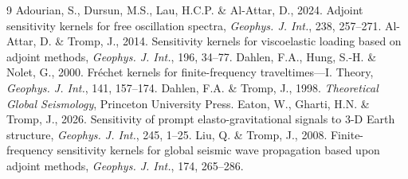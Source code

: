 \documentclass[11pt,a4paper]{article}
\theoremstyle{remark}
\begin{document}
\begin{thebibliography}{9}
Adourian, S., Dursun, M.S., Lau, H.C.P. \& Al-Attar, D., 2024. Adjoint
sensitivity kernels for free oscillation spectra, \emph{Geophys. J. Int.},
238, 257--271.
Al-Attar, D. \& Tromp, J., 2014. Sensitivity kernels for viscoelastic
loading based on adjoint methods, \emph{Geophys. J. Int.}, 196, 34--77.
Dahlen, F.A., Hung, S.-H. \& Nolet, G., 2000. Fr\'echet kernels for
finite-frequency traveltimes---I. Theory, \emph{Geophys. J. Int.}, 141,
157--174.
Dahlen, F.A. \& Tromp, J., 1998. \emph{Theoretical Global Seismology},
Princeton University Press.
Eaton, W., Gharti, H.N. \& Tromp, J., 2026. Sensitivity of prompt
elasto-gravitational signals to 3-D Earth structure, \emph{Geophys. J.
Int.}, 245, 1--25.
Liu, Q. \& Tromp, J., 2008. Finite-frequency sensitivity kernels for global
seismic wave propagation based upon adjoint methods, \emph{Geophys. J.
Int.}, 174, 265--286.
\end{thebibliography}
\end{document}
